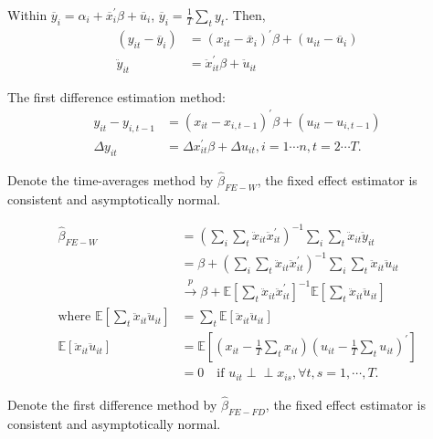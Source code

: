 Within $\overline{y}_i = \alpha_i + \overline{x}_i^{\prime} \beta +\overline{u}_i$, $\overline{y}_i = \frac{1}{T} \sum_t y_t.$
Then, 
\begin{align*}
    (y_{it} - \overline{y}_i) &= (x_{it} - \overline{x}_i)^{\prime} \beta + (u_{it} -\overline{u}_i) \\
    \ddot{y}_{it} &= \ddot{x}_{it}^{\prime} \beta + \ddot{u}_{it}
\end{align*}

The first difference estimation method:
\begin{align*}
    y_{it} - y_{i, t-1} &= (x_{it} - x_{i, t-1})^{\prime} \beta + (u_{it} - u_{i, t-1}) \\
    \Delta y_{it} &= \Delta x_{it}^{\prime} \beta + \Delta u_{it}, i=1 \cdots n, t=2 \cdots T.
\end{align*}

Denote the time-averages method by $\hat{\beta}_{FE-W}$, the fixed effect estimator is consistent and asymptotically normal.

\begin{align*}
    \hat{\beta}_{FE-W} &= \left(\sum_i \sum_t \ddot{x}_{it} \ddot{x}_{it}^{\prime} \right)^{-1} \sum_i \sum_t \ddot{x}_{it} \ddot{y}_{it} \\
    &= \beta + \left(\sum_i \sum_t \ddot{x}_{it} \ddot{x}_{it}^{\prime} \right)^{-1} \sum_i \sum_t \ddot{x}_{it} \ddot{u}_{it} \\
    &\overset{p}{\rightarrow} \beta + \mathbb{E}\left[\sum_t \ddot{x}_{it} \ddot{x}_{it}^{\prime} \right]^{-1} \mathbb{E}\left[\sum_t \ddot{x}_{it} \ddot{u}_{it} \right] \\
    \text{where } \mathbb{E}\left[\sum_t \ddot{x}_{it} \ddot{u}_{it}\right] &= \sum_t \mathbb{E}\left[\ddot{x}_{it} \ddot{u}_{it} \right]\\
    \mathbb{E}\left[\ddot{x}_{it} \ddot{u}_{it} \right] &= \mathbb{E}\left[\left(x_{it} - \frac{1}{T}\sum_t x_{it} \right) \left(u_{it} - \frac{1}{T}\sum_t u_{it} \right)^{\prime} \right] \\
    &= 0 \quad \text{if } u_{it} \perp\!\!\!\perp x_{is}, \forall t, s = 1, \cdots, T.
\end{align*}

Denote the first difference method by $\hat{\beta}_{FE-FD}$, the fixed effect estimator is consistent and asymptotically normal.


